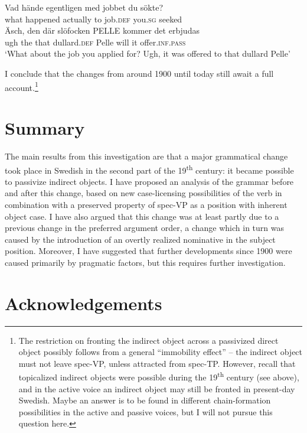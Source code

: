 \documentclass[output=paper]{langscibook}
\begin{document}
\ea%
    \label{ex:falk:28}
\gll Vad    hände    egentligen  med  jobbet    du      sökte?\\
    what    happened  actually    to    job.\textsc{def}  you.\textsc{sg}  seeked\\

\gll Äsch,  den  där  slöfocken    PELLE  kommer  det  erbjudas\\
    ugh    the  that  dullard.\textsc{def}    Pelle    will      it    offer.\textsc{inf.pass}\\
\glt ‘What about the job you applied for? Ugh, it was offered to that dullard Pelle’
\z



I conclude that the changes from around 1900 until today still await a full account.\footnote{The restriction on fronting the indirect object across a passivized direct object possibly follows from a general “immobility effect” – the indirect object must not leave spec-VP, unless attracted from spec-TP. However, recall that topicalized indirect objects were possible during the 19\textsuperscript{th} century (see  above), and in the active voice an indirect object may still be fronted in present-day Swedish. Maybe an answer is to be found in different chain-formation possibilities in the active and passive voices, but I will not pursue this question here.}

\section{Summary}\label{sec:falk:6}


The main results from this investigation are that a major grammatical change took place in Swedish in the second part of the 19\textsuperscript{th} century: it became possible to passivize indirect objects. I have proposed an analysis of the grammar before and after this change, based on new case-licensing possibilities of the verb in combination with a preserved property of spec-VP as a position with inherent object case. I have also argued that this change was at least partly due to a previous change in the preferred argument order, a change which in turn was caused by the introduction of an overtly realized nominative in the subject position. Moreover, I have suggested that further developments since 1900 were caused primarily by pragmatic factors, but this requires further investigation.

\section*{Acknowledgements}
\end{document}

